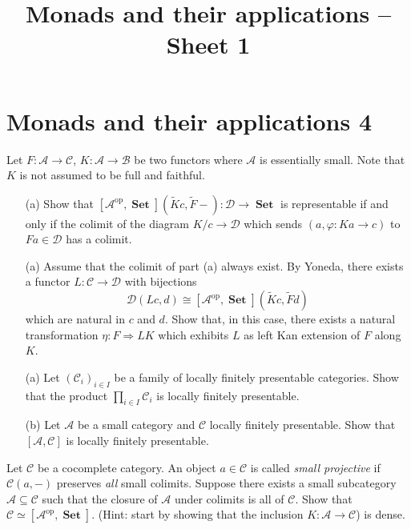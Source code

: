 \documentclass[12pt, a4paper]{article}
\date{}
\title{Monads and their applications -- Sheet 1}
\DeclareMathOperator{\op}{op}
\DeclareMathOperator{\Set}{\mathbf{Set}}
\newcommand{\ca}[1]{\mathscr{#1}}
\theoremstyle{plain}
\theoremstyle{definition}
\theoremstyle{citing}
\theoremstyle{citingdfn}
\numberwithin{equation}{section}
\begin{document}

\pagestyle{empty}
\section*{Monads and their applications 4}

\begin{question} 
 Let $F \colon \ca{A} \rightarrow \ca{C}$, $K \colon \ca{A} \rightarrow \ca{B}$ be two functors where $\ca{A}$ is essentially small. Note that $K$ is not assumed to be full and faithful.
\begin{enumerate}
\item[(a)]
 Show that $[\ca{A}^{\op},\Set](\widetilde{K} c, \widetilde{F} -) \colon \ca{D} \rightarrow \Set$ is representable if and only if the colimit of the diagram $K \slash c \rightarrow \ca{D}$ which sends $(a,\varphi \colon Ka \rightarrow c)$ to $Fa \in \ca{D}$ has a colimit.
 \item[(a)]
 Assume that the colimit of part (a) always exist. By Yoneda, there exists a functor $L \colon \ca{C} \rightarrow \ca{D}$ with bijections
 \[
 \ca{D}(Lc,d) \cong [\ca{A}^{\op},\Set](\widetilde{K}c,\widetilde{F}d)
 \]
 which are natural in $c$ and $d$. Show that, in this case, there exists a natural transformation $\eta \colon F \Rightarrow LK$ which exhibits $L$ as left Kan extension of $F$ along $K$.
\end{enumerate} 
\end{question}

\begin{question}
\begin{enumerate}
\item[(a)] Let $(\ca{C}_i)_{i \in I}$ be a family of locally finitely presentable categories. Show that the product $\prod_{i \in I } \ca{C}_i$ is locally finitely presentable.
\item[(b)] Let $\ca{A}$ be a small category and $\ca{C}$ locally finitely presentable. Show that $[\ca{A},\ca{C}]$ is locally finitely presentable.
\end{enumerate}
\end{question}

\begin{question}
 Let $\ca{C}$ be a cocomplete category. An object $a \in \ca{C}$ is called \emph{small projective} if $\ca{C}(a,-)$ preserves \emph{all} small colimits. Suppose there exists a small subcategory $\ca{A} \subseteq \ca{C}$ such that the closure of $\ca{A}$ under colimits is all of $\ca{C}$. Show that $\ca{C} \simeq [\ca{A}^{\op},\Set]$. (Hint: start by showing that the inclusion $K \colon \ca{A} \rightarrow \ca{C}$) is dense.
\end{question}
\end{document}
